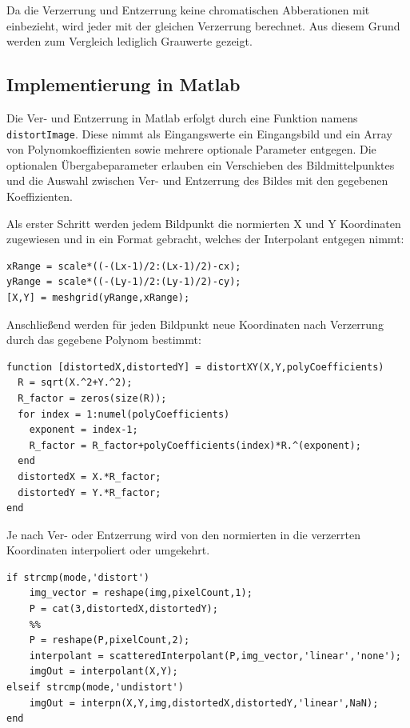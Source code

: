 Da die Verzerrung und Entzerrung keine chromatischen Abberationen mit einbezieht, wird jeder mit der gleichen Verzerrung berechnet. Aus diesem Grund werden zum Vergleich lediglich Grauwerte gezeigt.

\subsection{Implementierung in Matlab}
Die Ver- und Entzerrung in Matlab erfolgt durch eine Funktion namens \texttt{distortImage}. Diese nimmt als Eingangswerte ein Eingangsbild und ein Array von Polynomkoeffizienten sowie mehrere optionale Parameter entgegen. Die optionalen Übergabeparameter erlauben ein Verschieben des Bildmittelpunktes und die Auswahl zwischen Ver- und Entzerrung des Bildes mit den gegebenen Koeffizienten. 

Als erster Schritt werden jedem Bildpunkt die normierten X und Y Koordinaten zugewiesen und in ein Format gebracht, welches der Interpolant entgegen nimmt:
\begin{lstlisting}[style=Matlab-editor,basicstyle=\mlttfamily]
%% Bestimmung der normierten X und Y-Koordinaten mit Center-Offset
xRange = scale*((-(Lx-1)/2:(Lx-1)/2)-cx);
yRange = scale*((-(Ly-1)/2:(Ly-1)/2)-cy);
[X,Y] = meshgrid(yRange,xRange);

\end{lstlisting}

Anschließend werden für jeden Bildpunkt neue Koordinaten nach Verzerrung durch das gegebene Polynom bestimmt:

\begin{lstlisting}[style=Matlab-editor,basicstyle=\mlttfamily]
%% Berechne das Verzerrungspolynom und verzerrte XY Coordinaten
function [distortedX,distortedY] = distortXY(X,Y,polyCoefficients)
  R = sqrt(X.^2+Y.^2);
  R_factor = zeros(size(R));
  for index = 1:numel(polyCoefficients)
    exponent = index-1;
    R_factor = R_factor+polyCoefficients(index)*R.^(exponent);
  end
  distortedX = X.*R_factor;
  distortedY = Y.*R_factor;
end
\end{lstlisting}

Je nach Ver- oder Entzerrung wird von den normierten in die verzerrten Koordinaten interpoliert oder umgekehrt.
\begin{lstlisting}[style=Matlab-editor,basicstyle=\mlttfamily]
%% Berechnung der X,Y Position nach Ver/Entzerrung
if strcmp(mode,'distort')
	img_vector = reshape(img,pixelCount,1);
	P = cat(3,distortedX,distortedY);
	%%
	P = reshape(P,pixelCount,2);
	interpolant = scatteredInterpolant(P,img_vector,'linear','none');
	imgOut = interpolant(X,Y);
elseif strcmp(mode,'undistort')
	imgOut = interpn(X,Y,img,distortedX,distortedY,'linear',NaN);
end
\end{lstlisting}



